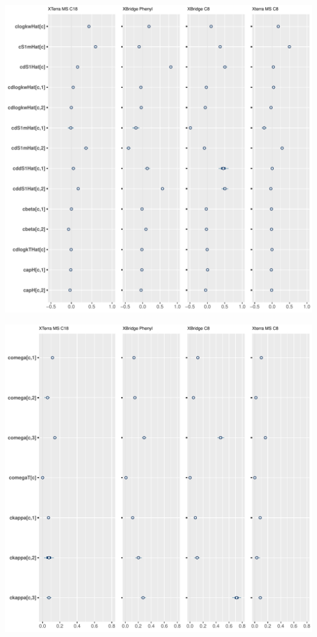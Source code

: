 \documentclass[
]{article}
\begin{document}
\newpage{}

\includegraphics{../figures/param/columneffects1.pdf}

\newpage{}

\includegraphics{../figures/param/columneffects2.pdf}
\end{document}
